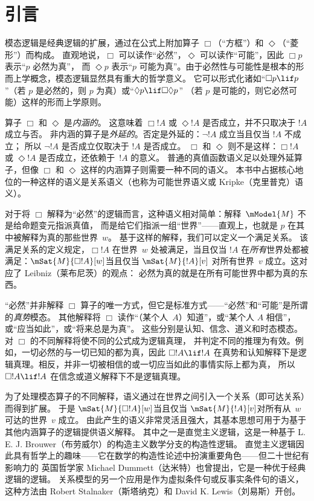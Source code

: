 
\chapter{引言}

模态逻辑是经典逻辑的扩展，通过在公式上附加算子 $\Box$（“方框”）和 $\Diamond$（“菱形”）而构成。
直观地说，$\Box$ 可以读作“必然”，$\Diamond$ 可以读作“可能”，因此 $\Box p$ 表示“$p$ 必然为真”，
而 $\Diamond p$ 表示“$p$ 可能为真”。由于必然性与可能性是根本的形而上学概念，模态逻辑显然具有重大的哲学意义。
它可以形式化诸如“$\Box p \lif p$”（若 $p$ 是必然的，则 $p$ 为真）或“$\Diamond p \lif \Box\Diamond p$”
（若 $p$ 是可能的，则它必然可能）这样的形而上学原则。

算子 $\Box$ 和 $\Diamond$ 是\emph{内涵的}。
这意味着 $\Box !A$ 或 $\Diamond !A$ 是否成立，并不只取决于 $!A$ 成立与否。
非内涵的算子是\emph{外延的}。否定是外延的：$\lnot !A$ 成立当且仅当 $!A$ 不成立；
所以 $\lnot !A$ 是否成立仅取决于 $!A$ 是否成立。
$\Box$ 和 $\Diamond$ 则不是这样：$\Box !A$ 或 $\Diamond !A$ 是否成立，还依赖于~$!A$ 的意义。
普通的真值函数语义足以处理外延算子，但像 $\Box$ 和 $\Diamond$ 这样的内涵算子则需要一种不同的语义。
本书中占据核心地位的一种这样的语义是关系语义（也称为可能世界语义或 Kripke（克里普克）语义）。

对于将 $\Box$ 解释为“必然”的逻辑而言，这种语义相对简单：解释~$\mModel{M}$ 不是给命题变元指派真值，
而是给它们指派一组“世界”——直观上，也就是 $p$ 在其中被解释为真的那些世界~$w$。
基于这样的解释，我们可以定义一个满足关系。
该满足关系的定义规定，$\Box !A$ 在世界~$w$ 处被满足，当且仅当 $!A$ 在\emph{所有}世界处都被满足：$\mSat{M}{\Box !A}[w]$当且仅当
$\mSat{M}{!A}[v]$ 对所有世界~$v$ 成立。这对应了 Leibniz（莱布尼茨）的观点：
必然为真的就是在所有可能世界中都为真的东西。

“必然”并非解释 $\Box$ 算子的唯一方式，但它是标准方式——“必然”和“可能”是所谓的\emph{真势}模态。
其他解释将 $\Box$ 读作“（某个人~$A$）知道”，或“某个人 $A$ 相信”，或“应当如此”，或“将来总是为真”。
这些分别是认知、信念、道义和时态模态。对 $\Box$ 的不同解释将使不同的公式成为逻辑真理，
并判定不同的推理为有效。例如，一切必然的与一切已知的都为真，因此 $\Box !A \lif !A$
在真势和认知解释下是逻辑真理。相反，并非一切被相信的或一切应当如此的事情实际上都为真，
所以 $\Box !A \lif !A$ 在信念或道义解释下不是逻辑真理。

为了处理模态算子的不同解释，语义通过在世界之间引入一个关系（即可达关系）而得到扩展。
于是 $\mSat{M}{\Box !A}[w]$当且仅当 $\mSat{M}{!A}[v]$对所有从~$w$ 可达的世界~$v$ 成立。
由此产生的语义非常灵活且强大，其基本思想可用于为基于其他内涵算子的逻辑提供语义解释。
其中之一是直觉主义逻辑，这是一种基于 L. E. J. Brouwer（布劳威尔）的构造主义数学分支的构造性逻辑。
直觉主义逻辑因此具有哲学上的趣味——它在数学的构造性论述中扮演重要角色——但二十世纪有影响力的
英国哲学家 Michael Dummett（达米特）也曾提出，它是一种优于经典逻辑的逻辑。
关系模型的另一个应用是作为虚拟条件句或反事实条件句的语义，这种方法由 Robert Stalnaker（斯塔纳克）和 David K. Lewis（刘易斯）开创。

